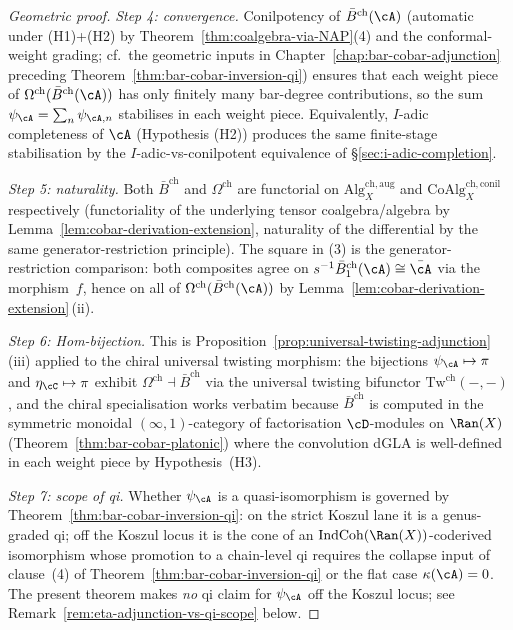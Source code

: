 \begin{proof}[Geometric proof]
\emph{Step 4: convergence.}
Conilpotency of $\bar{B}^{\mathrm{ch}}(\cA)$
\textup{(}automatic under (H1)+(H2) by
Theorem~\ref{thm:coalgebra-via-NAP}(4) and the conformal-weight grading;
cf.\ the geometric inputs in Chapter~\ref{chap:bar-cobar-adjunction}
preceding Theorem~\ref{thm:bar-cobar-inversion-qi}\textup{)} ensures that
each weight piece of $\Omega^{\mathrm{ch}}(\bar{B}^{\mathrm{ch}}(\cA))$ has
only finitely many bar-degree contributions, so the sum
$\psi_{\cA} = \sum_n \psi_{\cA,n}$ stabilises in each weight piece.
Equivalently, $I$-adic completeness of $\cA$
\textup{(}Hypothesis (H2)\textup{)} produces the same finite-stage
stabilisation by the $I$-adic-vs-conilpotent equivalence of
\S\ref{sec:i-adic-completion}.

\emph{Step 5: naturality.}
Both $\bar{B}^{\mathrm{ch}}$ and $\Omega^{\mathrm{ch}}$ are functorial on
$\mathrm{Alg}^{\mathrm{ch,aug}}_X$ and $\mathrm{CoAlg}^{\mathrm{ch,conil}}_X$
respectively
\textup{(}functoriality of the underlying tensor coalgebra/algebra by
Lemma~\ref{lem:cobar-derivation-extension}, naturality of the differential
by the same generator-restriction principle\textup{)}. The square in (3) is
the generator-restriction comparison: both composites agree on
$s^{-1}\bar{B}^{\mathrm{ch}}_1(\cA) \cong \bar{\cA}$ via the morphism~$f$,
hence on all of $\Omega^{\mathrm{ch}}(\bar{B}^{\mathrm{ch}}(\cA))$ by
Lemma~\ref{lem:cobar-derivation-extension}\,(ii).

\emph{Step 6: Hom-bijection.}
This is Proposition~\ref{prop:universal-twisting-adjunction}(iii) applied to
the chiral universal twisting morphism: the bijections
$\psi_\cA \mapsto \pi$ and $\eta_\cC \mapsto \pi$ exhibit
$\Omega^{\mathrm{ch}} \dashv \bar{B}^{\mathrm{ch}}$ via the universal
twisting bifunctor $\mathrm{Tw}^{\mathrm{ch}}(-,-)$, and the chiral
specialisation works verbatim because $\bar{B}^{\mathrm{ch}}$ is computed in
the symmetric monoidal $(\infty,1)$-category of factorisation $\cD$-modules
on $\Ran(X)$
\textup{(}Theorem~\ref{thm:bar-cobar-platonic}\textup{)} where the
convolution dGLA is well-defined in each weight piece by
Hypothesis~(H3).

\emph{Step 7: scope of qi.}
Whether $\psi_{\cA}$ is a quasi-isomorphism is governed by
Theorem~\ref{thm:bar-cobar-inversion-qi}: on the strict Koszul lane it is a
genus-graded qi; off the Koszul locus it is the cone of an
$\mathrm{IndCoh}(\Ran(X))$-coderived isomorphism whose promotion to a
chain-level qi requires the collapse input of clause~(4) of
Theorem~\ref{thm:bar-cobar-inversion-qi} or the flat case
$\kappa(\cA) = 0$. The present theorem makes \emph{no} qi claim for
$\psi_{\cA}$ off the Koszul locus; see
Remark~\ref{rem:eta-adjunction-vs-qi-scope} below.
\end{proof}

